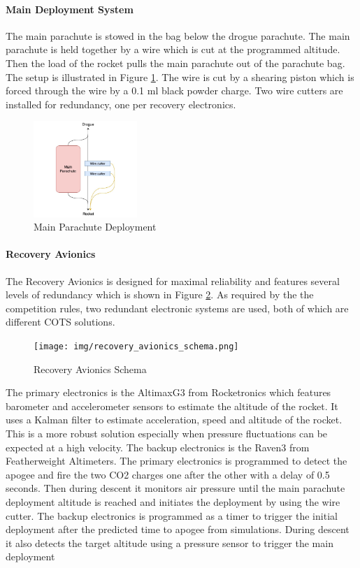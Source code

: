 \paragraph{Main Deployment System}
\hfill \break
The main parachute is stowed in the bag below the drogue parachute. The main parachute is held together by a wire which is cut at the programmed altitude. Then the load of the rocket pulls the main parachute out of the parachute bag. The setup is illustrated in Figure \ref{f:recovery_main_deployment}. The wire is cut by a shearing piston which is forced through the wire by a 0.1 ml black powder charge. Two wire cutters are installed for redundancy, one per recovery electronics.
\begin{figure}[h!]
 	\centering
        \includegraphics[width=0.35\textwidth]{img/recovery_main_deployment.jpg}
        \caption{Main Parachute Deployment}
        \label{f:recovery_main_deployment}
 \end{figure}
 \paragraph{Recovery Avionics}
 \hfill \break
The Recovery Avionics is designed for maximal reliability and features several levels of redundancy which is shown in Figure \ref{f:recovery_avionics_schema}. As required by the the competition rules, two redundant electronic systems are used, both of which are different COTS solutions.
  \begin{figure}[h!]
    \centering
        \texttt{[image: img/recovery\_avionics\_schema.png]}
        \caption{Recovery Avionics Schema}
        \label{f:recovery_avionics_schema}
 \end{figure}
The primary electronics is the AltimaxG3 from Rocketronics which features barometer and accelerometer sensors to estimate the altitude of the rocket. It uses a Kalman filter to estimate acceleration, speed and altitude of the rocket. This is a more robust solution especially when pressure fluctuations can be expected at a high velocity.
The backup electronics is the Raven3 from Featherweight Altimeters.
The primary electronics is programmed to detect the apogee and fire the two CO2 charges one after the other with a delay of 0.5 seconds. Then during descent it monitors air pressure until the main parachute deployment altitude is reached and initiates the deployment by using the wire cutter.
The backup electronics is programmed as a timer to trigger the initial deployment after the predicted time to apogee from simulations. During descent it also detects the target altitude using a pressure sensor to trigger the main deployment


